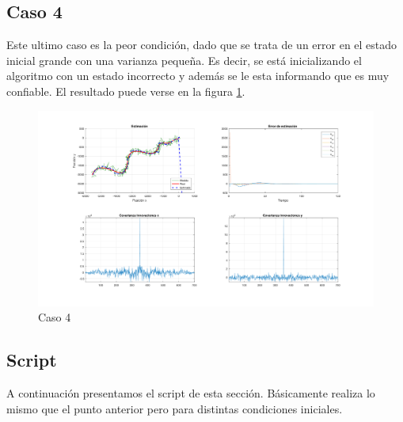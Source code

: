 	\subsection{Caso 4}
	
	Este ultimo caso es la peor condición, dado que se trata de un error en el estado inicial grande con una varianza pequeña. Es decir, se está inicializando el algoritmo con un estado incorrecto y además se le esta informando que es muy confiable. El resultado puede verse en la figura \ref{fig:ej3d}.
	
		\begin{figure}[H]
			\centering
			\includegraphics[scale=0.5,trim={6,5cm 0 0 0}]{Figuras/graf_ej3d.pdf}
			\caption{Caso 4}
			\label{fig:ej3d}
		\end{figure}
		
	\subsection{Script}
	
		A continuación presentamos el script de esta sección. Básicamente realiza lo mismo que el punto anterior pero para distintas condiciones iniciales.

%	
	
